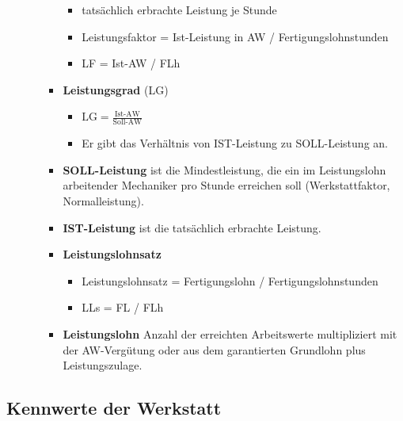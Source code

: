 \begin{enumerate}
\begin{itemize}
\begin{itemize}
      \begin{itemize}
      \item
        tatsächlich erbrachte Leistung je Stunde
      \item
        Leistungsfaktor = Ist-Leistung in AW / Fertigungslohnstunden
      \item
        LF = Ist-AW / FLh
      \end{itemize}
    \item
      \textbf{Leistungsgrad} (LG)

      \begin{itemize}
      \item
        $\boxed{\text{LG} = \frac{\text{Ist-AW}}{\text{Soll-AW}}}$
      \item
        Er gibt das Verhältnis von IST-Leistung zu SOLL-Leistung an.
      \end{itemize}
    \item
      \textbf{SOLL-Leistung} ist die Mindestleistung, die ein im
      Leistungslohn arbeitender Mechaniker pro Stunde erreichen soll
      (Werkstattfaktor, Normalleistung).
    \item
      \textbf{IST-Leistung} ist die tatsächlich erbrachte Leistung.
    \item
      \textbf{Leistungslohnsatz}

      \begin{itemize}
      \item
        Leistungslohnsatz = Fertigungslohn / Fertigungslohnstunden
      \item
        LLs = FL / FLh
      \end{itemize}
    \item
      \textbf{Leistungslohn} Anzahl der erreichten Arbeitswerte
      multipliziert mit der AW-Vergütung oder aus dem garantierten
      Grundlohn plus Leistungszulage.
    \end{itemize}
  \end{itemize}
\end{enumerate}

\newpage

\subsection{Kennwerte der Werkstatt}\label{kennwerte-der-werkstatt}


